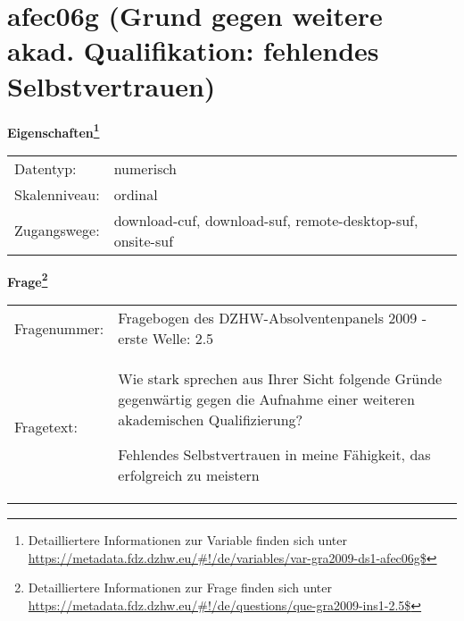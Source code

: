 
    \setcounter{footnote}{0}

    \vspace*{-1.8cm}
	\section{afec06g (Grund gegen weitere akad. Qualifikation: fehlendes Selbstvertrauen)}
	\label{section:afec06g}



    \vspace*{0.5cm}
    \noindent\textbf{Eigenschaften\footnote{Detailliertere Informationen zur Variable finden sich unter
		\url{https://metadata.fdz.dzhw.eu/\#!/de/variables/var-gra2009-ds1-afec06g$}}}\\
	\begin{tabularx}{\hsize}{@{}lX}
	Datentyp: & numerisch \\
	Skalenniveau: & ordinal \\
	Zugangswege: &
	  download-cuf, 
	  download-suf, 
	  remote-desktop-suf, 
	  onsite-suf
 \\
    \end{tabularx}



				\vspace*{0.5cm}
                \noindent\textbf{Frage\footnote{Detailliertere Informationen zur Frage finden sich unter
		              \url{https://metadata.fdz.dzhw.eu/\#!/de/questions/que-gra2009-ins1-2.5$}}}\\
				\begin{tabularx}{\hsize}{@{}lX}
					Fragenummer: &
					  Fragebogen des DZHW-Absolventenpanels 2009 - erste Welle:
					  2.5
 \\
					Fragetext: & Wie stark sprechen aus Ihrer Sicht folgende Gründe gegenwärtig gegen die Aufnahme einer weiteren akademischen Qualifizierung?\par  Fehlendes Selbstvertrauen in meine Fähigkeit, das erfolgreich zu meistern \\
				\end{tabularx}





